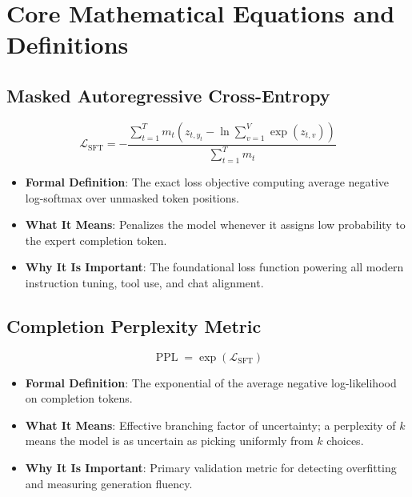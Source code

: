 \documentclass[11pt,a4paper]{article}
\theoremstyle{definition}
\begin{document}
\section{Core Mathematical Equations and Definitions}

\subsection{Masked Autoregressive Cross-Entropy}
{\boldmath
\begin{equation}
\mathcal{L}_{\text{SFT}} = - \frac{\sum_{t=1}^T m_t \left( z_{t, y_t} - \ln \sum_{v=1}^V \exp(z_{t, v}) \right)}{\sum_{t=1}^T m_t}
\end{equation}
}
\begin{itemize}
    \item \textbf{Formal Definition}: The exact loss objective computing average negative log-softmax over unmasked token positions.
    \item \textbf{What It Means}: Penalizes the model whenever it assigns low probability to the expert completion token.
    \item \textbf{Why It Is Important}: The foundational loss function powering all modern instruction tuning, tool use, and chat alignment.
\end{itemize}

\subsection{Completion Perplexity Metric}
{\boldmath
\begin{equation}
\operatorname{PPL} = \exp\left( \mathcal{L}_{\text{SFT}} \right)
\end{equation}
}
\begin{itemize}
    \item \textbf{Formal Definition}: The exponential of the average negative log-likelihood on completion tokens.
    \item \textbf{What It Means}: Effective branching factor of uncertainty; a perplexity of $k$ means the model is as uncertain as picking uniformly from $k$ choices.
    \item \textbf{Why It Is Important}: Primary validation metric for detecting overfitting and measuring generation fluency.
\end{itemize}
\end{document}
